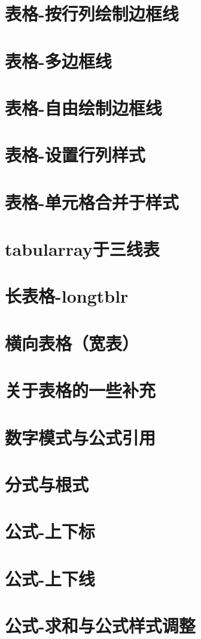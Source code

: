 \documentclass[12pt,a4paper]{ctexart}  %
\begin{document}
\section{表格-按行列绘制边框线}
\section{表格-多边框线}
\section{表格-自由绘制边框线}
\section{表格-设置行列样式}
\section{表格-单元格合并于样式}
\section{tabularray于三线表}
\section{长表格-longtblr}
\section{横向表格（宽表）}
\section{关于表格的一些补充}
\section{数字模式与公式引用}
\section{分式与根式}
\section{公式-上下标}
\section{公式-上下线}
\section{公式-求和与公式样式调整}
\end{document}
